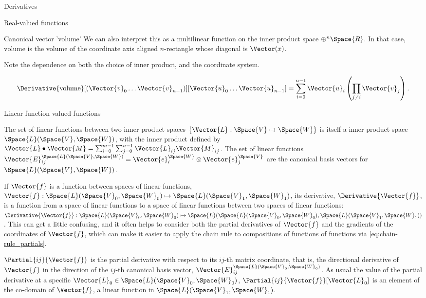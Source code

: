 \begin{plSection}{Derivatives}
\begin{plSection}{Real-valued functions}
\begin{plSection}{Canonical vector 'volume'}
We can also interpret this as a multilinear function on the
inner product space
$\oplus^{n} \Space{R}$.
In that case, $\text{volume}$ is the volume of the coordinate axis aligned
$n$-rectangle whose diagonal is $\Vector(x)$.

Note the dependence on both the choice of inner product, 
and the coordinate system.

\begin{equation}
\Derivative{\text{volume}}[(\Vector{v}_0 \ldots \Vector{v}_{n-1})][\Vector{u}_0 \ldots \Vector{u}_{n-1}]
 =  \sum_{i=0}^{n-1} \Vector{u}_i \left( \prod_{j \neq i} \Vector{v}_j \right).
\end{equation}

\end{plSection}%
\end{plSection}%
\begin{plSection}{Linear-function-valued functions}
\label{sec:Derivatives-of-linear-function-valued-functions}

The set of linear functions between two inner product spaces
$\{ \Vector{L} : \Space{V} \mapsto \Space{W} \}$
is itself a inner product space $\Space{L}(\Space{V},\Space{W})$,
with the inner product defined by
$\Vector{L} \bullet \Vector{M} = \sum_{i=0}^{m-1} \sum_{j=0}^{n-1} \Vector{L}_{ij} \Vector{M}_{ij}$.
The set of linear functions
$\Vector{E}_{ij}^{\Space{L}(\Space{V},\Space{W})}  = \Vector{e}_i^{\Space{W}} \otimes \Vector{e}_j^{\Space{V}}$
are the canonical basis vectors for $\Space{L}(\Space{V},\Space{W})$.

If $\Vector{f}$ is a function between spaces of linear functions,
$\Vector{f} : \Space{L}(\Space{V}_0,\Space{W}_0) \mapsto \Space{L}(\Space{V}_1,\Space{W}_1)$,
its derivative, $\Derivative{\Vector{f}}$,
is a function from a space of linear functions
to a space of linear functions between two
spaces of linear functions:
$\Derivative{\Vector{f}} : \Space{L}(\Space{V}_0,\Space{W}_0) \mapsto
\Space{L}(\Space{L}(\Space{V}_0,\Space{W}_0), \Space{L}(\Space{V}_1,\Space{W}_1))$.
This can get a little confusing,
and it often helps to consider both the partial derivatives of $\Vector{f}$
and the gradients of the coordinates of $\Vector{f}$,
which can make it easier to apply the chain rule to
compositions of functions of functions via \cref{eq:chain-rule_partials}.

$\Partial{ij}{\Vector{f}}$ is the partial derivative with respect to its $ij$-th matrix coordinate,
that is, the directional derivative of $\Vector{f}$ in the direction
of the $ij$-th canonical basis vector, $\Vector{E}_{ij}^{\Space{L}(\Space{V}_0,\Space{W}_0)}$.
As usual the value of the partial derivative at a specific
$\Vector{L}_0 \in  \Space{L}(\Space{V}_0,\Space{W}_0)$,
$\Partial{ij}{\Vector{f}}[\Vector{L}_0]$ 
is an element of the co-domain of $\Vector{f}$,
a linear function in  $\Space{L}(\Space{V}_1,\Space{W}_1)$.


\end{plSection}
\end{plSection}
